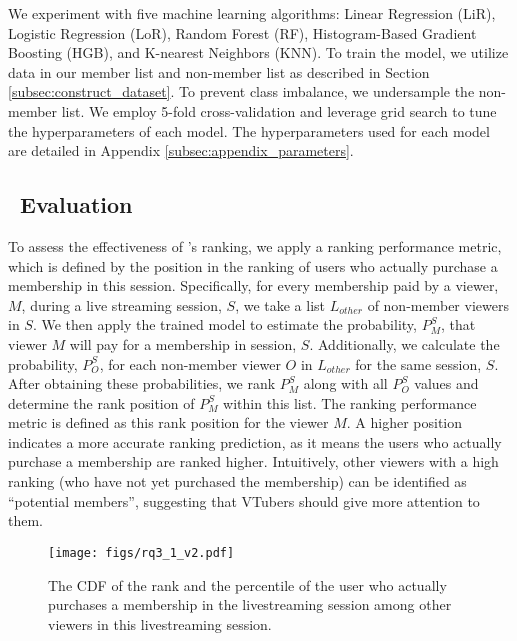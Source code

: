 We experiment with five machine learning algorithms: Linear Regression (LiR), Logistic Regression (LoR), Random Forest (RF), Histogram-Based Gradient Boosting (HGB), and K-nearest Neighbors (KNN). 
To train the model, we utilize data in our member list and non-member list as described in Section \ref{subsec:construct_dataset}. 
To prevent class imbalance, we undersample the non-member list.
We employ 5-fold cross-validation and leverage grid search to tune the hyperparameters of each model. The hyperparameters used  for each model are detailed in Appendix \ref{subsec:appendix_parameters}.


\subsection{\toolname~Evaluation}
\label{subsec:rq3_eval}
% 
To assess the effectiveness of \toolname's ranking, we apply a ranking performance metric, which is defined by the position in the ranking of users who actually purchase a membership in this session. 
% 
% 
Specifically, for every membership paid by a viewer, $M$, during a live streaming session, $S$, we take a list $L_{other}$ of non-member viewers in $S$. We then apply the trained model to estimate the probability, $P_M^S$, that viewer $M$ will pay for a membership in session, $S$. Additionally, we calculate the probability, $P_O^S$, for each non-member viewer $O$ in $L_{other}$ for the same session, $S$. After obtaining these probabilities, we rank $P_M^S$ along with all $P_O^S$ values and determine the rank position of $P_M^S$ within this list. 
The ranking performance metric is defined as this rank position for the viewer $M$.
% 
A higher position indicates a more accurate ranking prediction, as it means the users who actually purchase a membership are ranked higher. 
Intuitively, other viewers with a high ranking (who have not yet purchased the membership) can be identified as ``potential members'',  suggesting that VTubers should give more attention to them.


\begin{figure}
    \centering
    \texttt{[image: figs/rq3\_1\_v2.pdf]}
    \vspace{-2ex}
    \caption{The CDF of the rank and the percentile of the user who actually purchases a membership in the livestreaming  session among other viewers in this livestreaming session.}
    \vspace{-4ex}
    \label{fig:rq3_result}
\end{figure}

